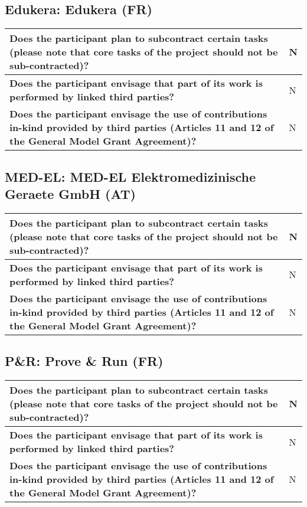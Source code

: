 \subsection*{Edukera: Edukera (FR)}

\begin{longtable}{|p{}|p{}|}
\hline
{\bf Does the participant plan to subcontract certain tasks (please
  note that core tasks of the project should not be sub-contracted)?}
&
N
\\
\hline
{\bf Does the participant envisage that  part of its work is performed
  by linked third parties?}
&
N
\\
\hline
{\bf Does the participant envisage the use of contributions in-kind
provided by third parties (Articles 11 and 12 of the General Model
Grant Agreement)?}
&
N
\\
\hline
\end{longtable}


\subsection*{MED-EL: MED-EL Elektromedizinische Geraete GmbH (AT)}

\begin{longtable}{|p{}|p{}|}
\hline
{\bf Does the participant plan to subcontract certain tasks (please
  note that core tasks of the project should not be sub-contracted)?}
&
N
\\
\hline
{\bf Does the participant envisage that  part of its work is performed
  by linked third parties?}
&
N
\\
\hline
{\bf Does the participant envisage the use of contributions in-kind
provided by third parties (Articles 11 and 12 of the General Model
Grant Agreement)?}
&
N
\\
\hline
\end{longtable}


\subsection*{P\&R: Prove \& Run (FR)}

\begin{longtable}{|p{}|p{}|}
\hline
{\bf Does the participant plan to subcontract certain tasks (please
  note that core tasks of the project should not be sub-contracted)?}
&
N
\\
\hline
{\bf Does the participant envisage that  part of its work is performed
  by linked third parties?}
&
N
\\
\hline
{\bf Does the participant envisage the use of contributions in-kind
provided by third parties (Articles 11 and 12 of the General Model
Grant Agreement)?}
&
N
\\
\hline
\end{longtable}


